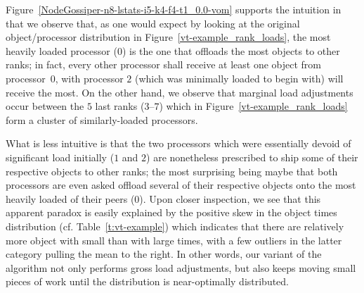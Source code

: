 Figure~\ref{NodeGossiper-n8-lstats-i5-k4-f4-t1_0.0-vom} supports
the intuition in that we observe that, as one would expect by looking at
the original object/processor distribution in
Figure~\ref{vt-example_rank_loads}, the most heavily loaded processor
($0$) is the one that offloads the most objects to other ranks; in
fact, every other processor shall receive at least one object from
processor~$0$, with processor $2$ (which was minimally loaded to begin
with) will receive the most.
On the other hand, we observe that marginal load adjustments occur
between the $5$ last ranks ($3$--$7$) which in
Figure~\ref{vt-example_rank_loads} form a cluster of similarly-loaded
processors.

What is less intuitive is that the two processors which were
essentially devoid of significant load initially ($1$ and $2$) are
nonetheless prescribed to ship some of their respective objects to
other ranks; the most surprising being maybe that both processors are
even asked offload several of their respective objects onto the most
heavily loaded of their peers ($0$). 
Upon closer inspection, we see that this apparent paradox is easily
explained by the positive skew in the object times distribution
(cf. Table~\ref{t:vt-example}) which indicates that there are
relatively more object with small than with large times, with a few
outliers in the latter category pulling the mean to the right.
In other words, our variant of the algorithm not only performs gross
load adjustments, but also keeps moving small pieces of work until the
distribution is near-optimally distributed.